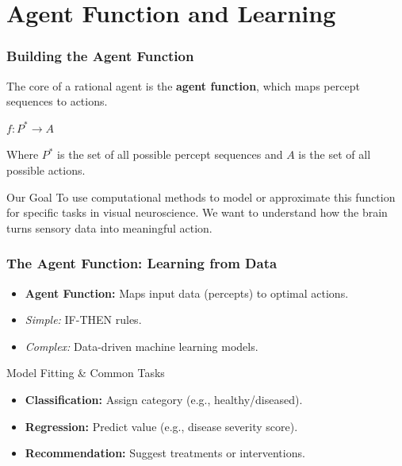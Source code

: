 \documentclass[handout]{beamer}
\begin{document}
\section{Agent Function and Learning}

\begin{frame}
	\frametitle{Building the Agent Function}
	The core of a rational agent is the \textbf{agent function}, which maps percept sequences to actions.
	\begin{center}
		$f: P^* \rightarrow A$
	\end{center}
	Where $P^*$ is the set of all possible percept sequences and $A$ is the set of all possible actions.
	
	\vspace{1cm}
	
	\begin{alertblock}{Our Goal}
		To use computational methods to model or approximate this function for specific tasks in visual neuroscience. We want to understand how the brain turns sensory data into meaningful action.
	\end{alertblock}
\end{frame}

\begin{frame}
	\frametitle[The Agent Function]{The Agent Function: Learning from Data}
	\begin{itemize}
		\item \textbf{Agent Function:} Maps input data (percepts) to optimal actions.
		\item \textit{Simple:} IF-THEN rules.
		\item \textit{Complex:} Data-driven machine learning models.
	\end{itemize}
	\pause
	\begin{alertblock}{Model Fitting \& Common Tasks}
		\begin{itemize}
			\item \textbf{Classification:} Assign category (e.g., healthy/diseased).
			\item \textbf{Regression:} Predict value (e.g., disease severity score).
			\item \textbf{Recommendation:} Suggest treatments or interventions.
		\end{itemize}
	\end{alertblock}
\end{frame}
\end{document}
